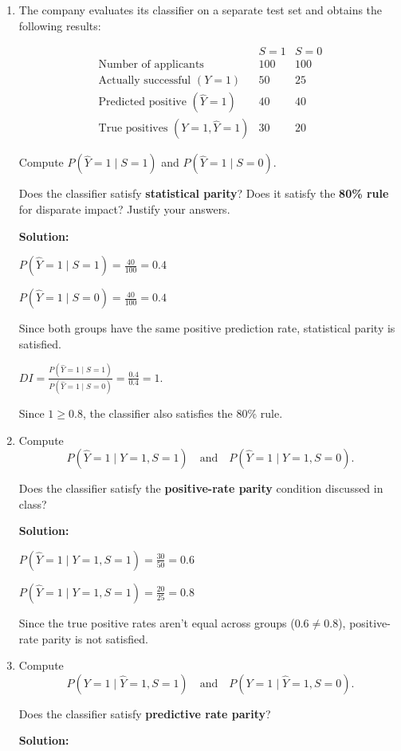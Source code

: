 \documentclass{article}
\begin{document}
\begin{enumerate}
\item[(c)] The company evaluates its classifier on a separate
test set and obtains the following results:

\[
\begin{array}{l|cc}
 & S=1 & S=0\\
\hline
\text{Number of applicants} & 100 & 100\\
\text{Actually successful }(Y=1) & 50 & 25\\
\text{Predicted positive }(\hat{Y}=1) & 40 & 40\\
\text{True positives }(Y=1,\hat{Y}=1) & 30 & 20
\end{array}
\]

Compute $P(\hat{Y}=1 \mid S=1)$ and
$P(\hat{Y}=1 \mid S=0)$.

Does the classifier satisfy \textbf{statistical parity}?
Does it satisfy the \textbf{80\% rule} for disparate impact?
Justify your answers.

\textbf{Solution:} 

$P(\hat{Y}=1\mid S=1)=\frac{40}{100}=0.4$

$P(\hat{Y}=1 \mid S=0)=\frac{40}{100}=0.4$

Since both groups have the same positive prediction rate, statistical parity is satisfied.

$DI = \frac{P(\hat{Y}=1\mid S=1)}{P(\hat{Y}=1\mid S=0)} = \frac{0.4}{0.4}=1.$

Since $1\geq0.8$, the classifier also satisfies the 80\% rule.


\item[(d)] Compute
\[
P(\hat{Y}=1 \mid Y=1,S=1)
\quad \text{and} \quad
P(\hat{Y}=1 \mid Y=1,S=0).
\]

Does the classifier satisfy the \textbf{positive-rate parity}
condition discussed in class?

\textbf{Solution:}

$P(\hat{Y}=1 \mid Y=1,S=1)=\frac{30}{50}=0.6$

$P(\hat{Y}=1 \mid Y=1,S=1)=\frac{20}{25}=0.8$

Since the true positive rates aren't equal across groups ($0.6\neq0.8$), positive-rate parity is not satisfied.

\item[(e)] Compute
\[
P(Y=1 \mid \hat{Y}=1,S=1)
\quad \text{and} \quad
P(Y=1 \mid \hat{Y}=1,S=0).
\]

Does the classifier satisfy \textbf{predictive rate parity}?

\textbf{Solution:}


\end{enumerate}
\end{document}
